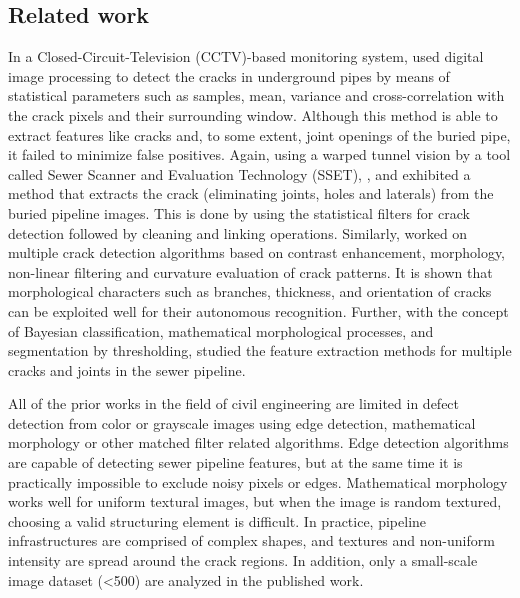 \documentclass[letterpaper,12pt, onecolumn]{article}%
\begin{document}
\subsection{Related work}
\noindent
In a Closed-Circuit-Television (CCTV)-based monitoring system, \cite{fieguths99} used digital image processing to detect the cracks in underground pipes by means of statistical parameters such as samples, mean, variance and cross-correlation with the crack pixels and their surrounding window. Although this method is able to extract features like cracks and, to some extent, joint openings of the buried pipe, it failed to minimize false positives. Again, using a warped tunnel vision by a tool called Sewer Scanner and Evaluation Technology (SSET), \cite{iseley}, \cite{Sinha200658} and \cite{iyer2013automated} exhibited a method that extracts the crack (eliminating joints, holes and laterals) from the buried pipeline images. This is done by using the statistical filters for crack detection followed by cleaning and linking operations. Similarly, \cite{iyer_shiva} worked on multiple crack detection algorithms based on contrast enhancement, morphology, non-linear filtering and curvature evaluation of crack patterns. It is shown that morphological characters such as branches, thickness, and orientation of cracks can be exploited well for their autonomous recognition. Further, with the concept of Bayesian classification, mathematical morphological processes, and segmentation by thresholding, \cite{Sinha200647} studied the feature extraction methods for multiple cracks and joints in the sewer pipeline.

All of the prior works in the field of civil engineering are limited in defect detection from color or grayscale images using edge detection, mathematical morphology or other matched filter related algorithms. Edge detection algorithms are capable of detecting sewer pipeline features, but at the same time it is practically impossible to exclude noisy pixels or edges. Mathematical morphology works well for uniform textural images, but when the image is random textured, choosing a valid structuring element is difficult. In practice, pipeline infrastructures are comprised of complex shapes, and textures and non-uniform intensity are spread around the crack regions. In addition, only a small-scale image dataset (<500) are analyzed in the published work. 
\end{document}
